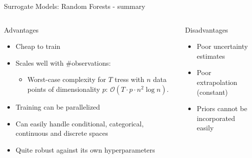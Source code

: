 \begin{frame}[c]{Surrogate Models: Random Forests - summary}


\begin{columns}[T] %
\begin{column}{.48\textwidth}

    \begin{block}{Advantages}
    \begin{itemize}
        \item Cheap to train 
        \item Scales well with \#observations: 
        \begin{itemize}
        	\item Worst-case complexity for $T$ tress with $n$ data points of dimensionality $p$: $\mathcal O(T\cdot p \cdot n^2 \log{n})$. 
        \end{itemize}
        \item Training can be parallelized 
        \item Can easily handle conditional, categorical, continuous and discrete spaces 
        \item Quite robust against its own hyperparameters
    \end{itemize}
    \end{block}
\end{column}%

\hfill%
\pause

\begin{column}{.48\textwidth}
    \begin{block}{Disadvantages}
    \begin{itemize}
        \item Poor uncertainty estimates 
        \item Poor extrapolation (constant) 
    	\item Priors cannot be incorporated easily 
    \end{itemize}
    \end{block}

\end{column}
\end{columns}

\end{frame}

